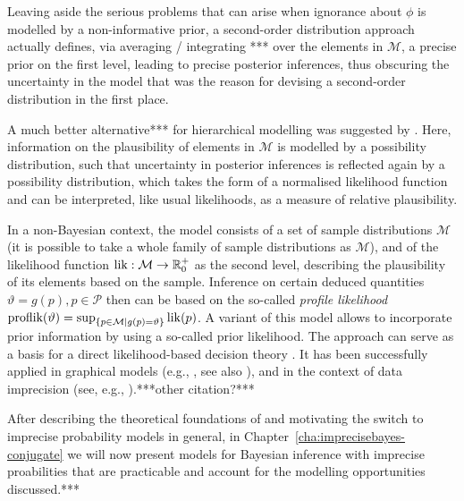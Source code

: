Leaving aside the serious problems that can arise when ignorance about $\phi$ is modelled by a non-informative prior,
a second-order distribution approach actually defines, via averaging / integrating *** over the elements in $\mathcal{M}$,
a precise prior on the first level, leading to precise posterior inferences,
thus obscuring the uncertainty in the model that was the reason
for devising a second-order distribution in the first place.

A much better alternative*** for hierarchical modelling was suggested by \textcite{2008:cattaneo}.
Here, information on the plausibility of elements in $\mathcal{M}$ is modelled
by a possibility distribution, such that uncertainty in posterior inferences is reflected
again by a possibility distribution, which takes the form of a normalised likelihood function
and can be interpreted, like usual likelihoods, as a measure of relative plausibility.

In a non-Bayesian context, the model consists of a set of sample distributions $\mathcal{M}$
(it is possible to take a whole family of sample distributions as $\mathcal{M}$),
and of the likelihood function $\operatorname{lik}: \mathcal{M} \to \mathbb{R}_0^+$ as the second level,
describing the plausibility of its elements based on the sample.
Inference on certain deduced quantities $\vartheta=g\left(p\right), p \in \mathcal{P}$
then can be based on the so-called \emph{profile likelihood}
$\text{proflik}(\vartheta) = \sup_{\{p \in \mathcal{M} \mid g(p)=\vartheta\}} \operatorname{lik}(p)$.
A variant of this model allows to incorporate prior information by using a so-called prior likelihood.
The approach can serve as a basis for a direct likelihood-based decision theory \parencite{2007a:cattaneo, 2012:cattaneo-technicalRep}.
It has been successfully applied in graphical models (e.g., \cite{2011:4:isipta},
see also \cite[\S 4.3]{itip-classification}), and in the context of data imprecision
(see, e.g., \cite[\S 8.1]{itip-statinf}).***other citation?***

\medskip

After describing the theoretical foundations of and motivating the switch to imprecise probability models in general,
in Chapter~\ref{cha:imprecisebayes-conjugate} we will now present 
models for Bayesian inference with imprecise proabilities
that are practicable and account for the modelling opportunities discussed.*** %


